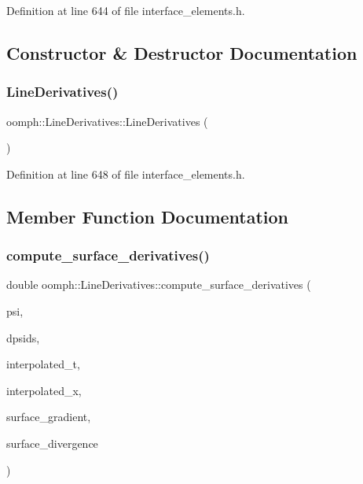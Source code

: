 Definition at line 644 of file interface\+\_\+elements.\+h.



\subsection{Constructor \& Destructor Documentation}
\mbox{\label{classoomph_1_1LineDerivatives_ab8e7af32651605a82d53995caddbe7fb}} 
\subsubsection{\texorpdfstring{Line\+Derivatives()}{LineDerivatives()}}
{\footnotesize\ttfamily oomph\+::\+Line\+Derivatives\+::\+Line\+Derivatives (\begin{DoxyParamCaption}{ }\end{DoxyParamCaption})\hspace{0.3cm}{\ttfamily [inline]}}



Definition at line 648 of file interface\+\_\+elements.\+h.



\subsection{Member Function Documentation}
\mbox{\label{classoomph_1_1LineDerivatives_aa50209ce504b25d255f9f0a6df36c0e3}} 
\subsubsection{\texorpdfstring{compute\+\_\+surface\+\_\+derivatives()}{compute\_surface\_derivatives()}}
{\footnotesize\ttfamily double oomph\+::\+Line\+Derivatives\+::compute\+\_\+surface\+\_\+derivatives (\begin{DoxyParamCaption}\item[{const Shape \&}]{psi,  }\item[{const D\+Shape \&}]{dpsids,  }\item[{const Dense\+Matrix$<$ double $>$ \&}]{interpolated\+\_\+t,  }\item[{const Vector$<$ double $>$ \&}]{interpolated\+\_\+x,  }\item[{D\+Shape \&}]{surface\+\_\+gradient,  }\item[{D\+Shape \&}]{surface\+\_\+divergence }\end{DoxyParamCaption})\hspace{0.3cm}{\ttfamily [protected]}}



